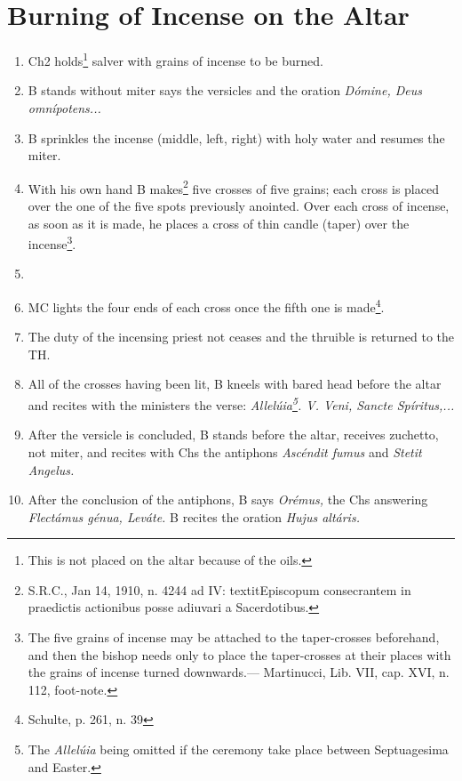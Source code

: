 \documentclass[letterpaper, twocolumn]{article}
\begin{document}
\section*{Burning of Incense on the Altar}
\begin{enumerate}
	\item Ch2 holds\footnote{This is not placed on the altar because of the oils.} salver with grains of incense to be burned.
	\item B stands without miter says the versicles and the oration \textit{Dómine, Deus omnípotens...}
	\item B sprinkles the incense (middle, left, right) with holy water and resumes the miter.
	\item With his own hand B makes\footnote{S.R.C., Jan 14, 1910, n. 4244 ad IV: textit{Episcopum consecrantem in praedictis actionibus posse adiuvari a Sacerdotibus.}} five crosses of five grains; each cross is placed over the one of the five spots previously anointed. Over each cross of incense, as soon as it is made, he places a cross of thin candle (taper) over the incense\footnote{The five grains of incense may be attached to the taper-crosses beforehand, and then the bishop needs only to place the taper-crosses at their places with the grains of incense turned downwards.— Martinucci, Lib. VII, cap. XVI, n. 112, foot-note.}.
	\item \item MC lights the four ends of each cross once the fifth one is made\footnote{Schulte, p. 261, n. 39}.
	\item The duty of the incensing priest not ceases and the thruible is returned to the TH.
	\item All of the crosses having been lit, B kneels with bared head before the altar and recites with the ministers the verse: \textit{Allelúia\footnote{The \textit{Allelúia} being omitted if the ceremony take place between Septuagesima and Easter.}. V. Veni, Sancte Spíritus,...}
	\item After the versicle is concluded, B stands before the altar, receives zuchetto, not miter, and recites with Chs the antiphons \textit{Ascéndit fumus} and \textit{Stetit Angelus.}
	\item After the conclusion of the antiphons, B says \textit{Orémus,} the Chs answering \textit{Flectámus génua, Leváte.} B recites the oration \textit{Hujus altáris.}
\end{enumerate}
\end{document}
